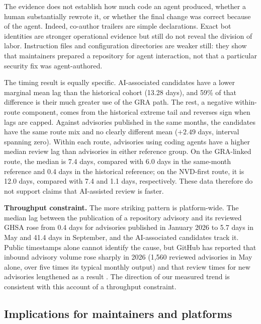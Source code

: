 \documentclass[smallextended,natbib]{svjour3}
\begin{document}

The evidence does not establish how much code an agent produced, whether a
human substantially rewrote it, or whether the final change was correct because
of the agent. Indeed, co-author trailers are simple declarations.   Exact bot
identities are stronger operational evidence but still do not reveal the
division of labor.  Instruction files and configuration directories are weaker
still: they show that maintainers prepared a repository for agent interaction,
not that a particular security fix was agent-authored.

The timing result is equally specific.  AI-associated candidates have a lower marginal mean lag than the
historical cohort (13.28 days), and 59\% of that difference is their much
greater use of the GRA path.  The rest, a negative within-route component, comes
from the historical extreme tail and reverses sign when lags are capped.
Against advisories published in the same months, the candidates have the same
route mix and no clearly different mean ($+2.49$ days, interval spanning zero).
Within each route, advisories using coding agents have a higher median review
lag than advisories in either reference group. On the GRA-linked route, the
median is 7.4 days, compared with 6.0 days in the same-month reference and
0.4 days in the historical reference; on the NVD-first route, it is 12.0 days,
compared with 7.4 and 1.1 days, respectively. These data therefore do not
support claims that AI-assisted review is faster.

\textbf{Throughput constraint. }
The more striking pattern is platform-wide.  The median lag between the
publication of a repository advisory and its reviewed GHSA rose from 0.4 days
for advisories published in January 2026 to 5.7 days in May and 41.4 days in
September, and the AI-associated candidates track it.  Public timestamps alone cannot identify the cause, but GitHub has
reported that inbound advisory volume rose sharply in 2026 (1{,}560 reviewed
advisories in May alone, over five times its typical monthly output) and that
review times for new advisories lengthened as a result
\citep{GitHubBlogAdvisoryVolume2026}.  The direction of our measured trend is
consistent with this account of a throughput constraint.

\subsection{Implications for maintainers and platforms}
\end{document}
